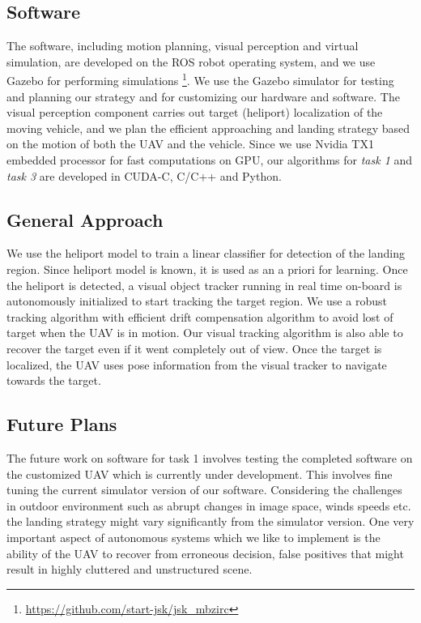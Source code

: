 \documentclass{standalone}
\begin{document}
\subsection{Software}

The software, including motion planning, visual perception and virtual simulation, are developed on the ROS robot operating system, and we use Gazebo for performing simulations \footnote{\url{https://github.com/start-jsk/jsk_mbzirc}}. We use the Gazebo simulator for testing and planning our strategy and for customizing our hardware and software. The visual perception component carries out target (heliport) localization of the moving vehicle, and we plan the efficient approaching and landing strategy based on the motion of both the UAV and the vehicle. Since we use Nvidia TX1 embedded processor for fast computations on GPU, our algorithms for \textit{task 1} and \textit{task 3} are developed in CUDA-C, C/C++ and Python. 



\subsection{General Approach}

We use the heliport model to train a linear classifier for detection of the landing region. Since heliport model is known, it is used as an a priori for learning. Once the heliport is detected, a visual object tracker running in real time on-board is autonomously initialized to start tracking the target region. We use a robust tracking algorithm with efficient drift compensation algorithm to avoid lost of target when the UAV is in motion. Our visual tracking algorithm is also able to recover the target even if it went completely out of view. Once the target is localized, the UAV uses pose information from the visual tracker to navigate towards the target. 



\subsection{Future Plans}
The future work on software for task 1 involves testing the completed software on the customized UAV which is currently under development. This involves fine tuning the current simulator version of our software. Considering the challenges in outdoor environment such as abrupt changes in image space, winds speeds etc. the landing strategy might vary significantly from the simulator version. One very important aspect of autonomous systems which we like to implement is the ability of the UAV to recover from erroneous decision, false positives that might result in highly cluttered and unstructured scene.

\end{document}
